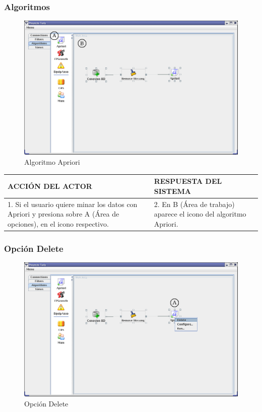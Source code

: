 \subsubsection{Algoritmos}
\begin{figure}[h]
 \centering
 \includegraphics[width=1\textwidth]{images/a1.png}
 \caption{Algoritmo Apriori}
\end{figure}

\begin{center}
\begin{tabular}{|p{60mm}|p{60mm}|}\hline
ACCI\'ON DEL ACTOR & RESPUESTA DEL SISTEMA \\ \hline
1. Si el usuario quiere minar los datos con Apriori y presiona sobre A (\'Area de opciones), en el icono respectivo.
& 2. En B (\'Area de trabajo) aparece el icono del algoritmo Apriori. \\ \hline
\end{tabular}
\end{center}
\newpage

\subsubsection{Opci\'on Delete}
\begin{figure}[h]
 \centering
 \includegraphics[width=1\textwidth]{images/am1.png}
 \caption{Opci\'on Delete}
\end{figure}


